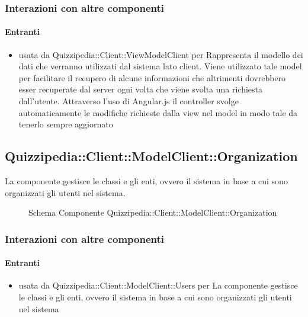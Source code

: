 \subsubsection{Interazioni con altre componenti}
\paragraph{Entranti}
\begin{itemize}
\item usata da Quizzipedia::Client::ViewModelClient per Rappresenta il modello dei dati che verranno utilizzati dal sistema lato client. Viene utilizzato tale model per facilitare il recupero di alcune informazioni che altrimenti dovrebbero esser recuperate dal server ogni volta che viene svolta una richiesta dall'utente.
Attraverso l'uso di Angular.js il controller svolge automaticamente le modifiche richieste dalla view nel model in modo tale da tenerlo sempre aggiornato
\end{itemize}
\subsection{Quizzipedia::Client::ModelClient::Organization}
La componente gestisce le classi e gli enti, ovvero il sistema in base a cui sono organizzati gli utenti nel sistema.
\begin{figure}[H]
\centering
\noindent{}
\caption[Schema Componente Quizzipedia::Client::ModelClient::Organization]{Schema Componente Quizzipedia::Client::ModelClient::Organization}
\end{figure}
\subsubsection{Interazioni con altre componenti}
\paragraph{Entranti}
\begin{itemize}
\item usata da Quizzipedia::Client::ModelClient::Users per La componente gestisce le classi e gli enti, ovvero il sistema in base a cui sono organizzati gli utenti nel sistema
\end{itemize}
